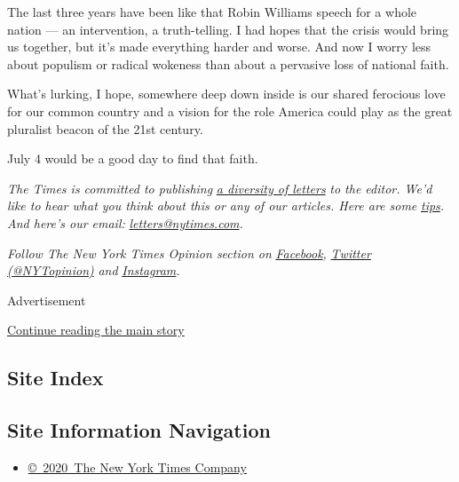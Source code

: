 The last three years have been like that Robin Williams speech for a
whole nation --- an intervention, a truth-telling. I had hopes that the
crisis would bring us together, but it's made everything harder and
worse. And now I worry less about populism or radical wokeness than
about a pervasive loss of national faith.

What's lurking, I hope, somewhere deep down inside is our shared
ferocious love for our common country and a vision for the role America
could play as the great pluralist beacon of the 21st century.

July 4 would be a good day to find that faith.

\emph{The Times is committed to publishing}
\href{https://www.nytimes.com/2019/01/31/opinion/letters/letters-to-editor-new-york-times-women.html}{\emph{a
diversity of letters}} \emph{to the editor. We'd like to hear what you
think about this or any of our articles. Here are some}
\href{https://help.nytimes.com/hc/en-us/articles/115014925288-How-to-submit-a-letter-to-the-editor}{\emph{tips}}\emph{.
And here's our email:}
\href{mailto:letters@nytimes.com}{\emph{letters@nytimes.com}}\emph{.}

\emph{Follow The New York Times Opinion section on}
\href{https://www.facebook.com/nytopinion}{\emph{Facebook}}\emph{,}
\href{http://twitter.com/NYTOpinion}{\emph{Twitter (@NYTopinion)}}
\emph{and}
\href{https://www.instagram.com/nytopinion/}{\emph{Instagram}}\emph{.}

Advertisement

\protect\hyperlink{after-bottom}{Continue reading the main story}

\hypertarget{site-index}{%
\subsection{Site Index}\label{site-index}}

\hypertarget{site-information-navigation}{%
\subsection{Site Information
Navigation}\label{site-information-navigation}}

\begin{itemize}
\tightlist
\item
  \href{https://help.nytimes.com/hc/en-us/articles/115014792127-Copyright-notice}{©~2020~The
  New York Times Company}
\end{itemize}

